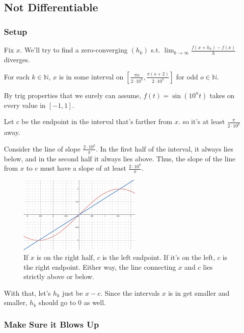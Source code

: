 \documentclass[12pt]{article}
\newcommand{\N}{\mathbb{N}}
\begin{document}
\subsection{Not Differentiable}

\subsubsection{Setup}

Fix $x$. We'll try to find a zero-converging $(h_k)$ s.t. $\lim_{k \to \infty} \frac{f(x+h_k)-f(x)}{h}$ diverges.

For each $k \in \N$, $x$ is in some interval on
$\left[\frac{\pi o}{2 \cdot 10^k}, \frac{\pi(o+2)}{2 \cdot 10^k}\right]$ for odd $o \in \N$.

By trig properties that we surely can assume,
$f(t)=\sin\left(10^n t\right)$ takes on every value in $[-1, 1]$.

Let $c$ be the endpoint in the interval that's farther from $x$.
so it's at least $\frac{\pi}{2 \cdot 10^k}$ away.

Consider the line of slope $\frac{2 \cdot 10^k}{\pi}$.
In the first half of the interval, it always lies below,
and in the second half it always lies above.
Thus, the slope of the line from $x$ to $c$ must have a slope of at least $\frac{2 \cdot 10^k}{\pi}$.

\begin{figure}[h]
  \centering
  \includegraphics[width=6cm]{img/hw2/please}
  \caption{
    If $x$ is on the right half, $c$ is the left endpoint.
    If it's on the left, $c$ is the right endpoint.
    Either way, the line connecting $x$ and $c$ lies strictly above or below.
  }
\end{figure}

With that, let's $h_k$ just be $x-c$.
Since the intervals $x$ is in get smaller and smaller, $h_k$ should go to $0$ as well.

\subsubsection{Make Sure it Blows Up}
\end{document}
